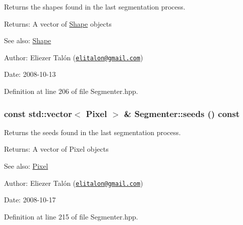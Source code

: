 Returns the shapes found in the last segmentation process. 

\begin{Desc}
\item[Returns:]A vector of \hyperlink{class_shape}{Shape} objects\end{Desc}
\begin{Desc}
\item[See also:]\hyperlink{class_shape}{Shape}\end{Desc}
\begin{Desc}
\item[Author:]Eliezer Talón (\href{mailto:elitalon@gmail.com}{\tt elitalon@gmail.com}) \end{Desc}
\begin{Desc}
\item[Date:]2008-10-13 \end{Desc}


Definition at line 206 of file Segmenter.hpp.\hypertarget{class_segmenter_100bffdc0fe9834d81ddc63661b4c1ec}{
\subsubsection[seeds]{\setlength{\rightskip}{0pt plus 5cm}const std::vector$<$ {\bf Pixel} $>$ \& Segmenter::seeds () const}}
\label{class_segmenter_100bffdc0fe9834d81ddc63661b4c1ec}


Returns the seeds found in the last segmentation process. 

\begin{Desc}
\item[Returns:]A vector of Pixel objects\end{Desc}
\begin{Desc}
\item[See also:]\hyperlink{_pixel_8hpp_535e59456e3e633842529cfa8ea103c4}{Pixel}\end{Desc}
\begin{Desc}
\item[Author:]Eliezer Talón (\href{mailto:elitalon@gmail.com}{\tt elitalon@gmail.com}) \end{Desc}
\begin{Desc}
\item[Date:]2008-10-17 \end{Desc}


Definition at line 215 of file Segmenter.hpp.

